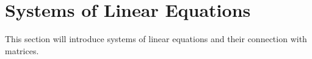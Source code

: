 \section{Systems of Linear Equations}

This section will introduce systems of linear equations and their connection with matrices.
